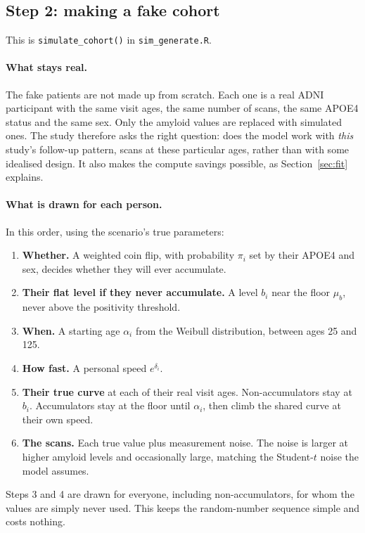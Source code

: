 \documentclass[11pt]{article}
\newcommand{\code}[1]{\texttt{\small #1}}
\begin{document}
\subsection{Step 2: making a fake cohort}

This is \code{simulate\_cohort()} in \code{sim\_generate.R}.

\paragraph{What stays real.} The fake patients are not made up from scratch. Each one is a real ADNI participant with the same visit ages, the same number of scans, the same APOE4 status and the same sex. Only the amyloid values are replaced with simulated ones. The study therefore asks the right question: does the model work with \emph{this} study's follow-up pattern, scans at these particular ages, rather than with some idealised design. It also makes the compute savings possible, as Section~\ref{sec:fit} explains.

\paragraph{What is drawn for each person.} In this order, using the scenario's true parameters:

\begin{enumerate}
  \item \textbf{Whether.} A weighted coin flip, with probability $\pi_i$ set by their APOE4 and sex, decides whether they will ever accumulate.
  \item \textbf{Their flat level if they never accumulate.} A level $b_i$ near the floor $\mu_b$, never above the positivity threshold.
  \item \textbf{When.} A starting age $\alpha_i$ from the Weibull distribution, between ages 25 and 125.
  \item \textbf{How fast.} A personal speed $e^{\delta_i}$.
  \item \textbf{Their true curve} at each of their real visit ages. Non-accumulators stay at $b_i$. Accumulators stay at the floor until $\alpha_i$, then climb the shared curve at their own speed.
  \item \textbf{The scans.} Each true value plus measurement noise. The noise is larger at higher amyloid levels and occasionally large, matching the Student-$t$ noise the model assumes.
\end{enumerate}

Steps 3 and 4 are drawn for everyone, including non-accumulators, for whom the values are simply never used. This keeps the random-number sequence simple and costs nothing.
\end{document}
